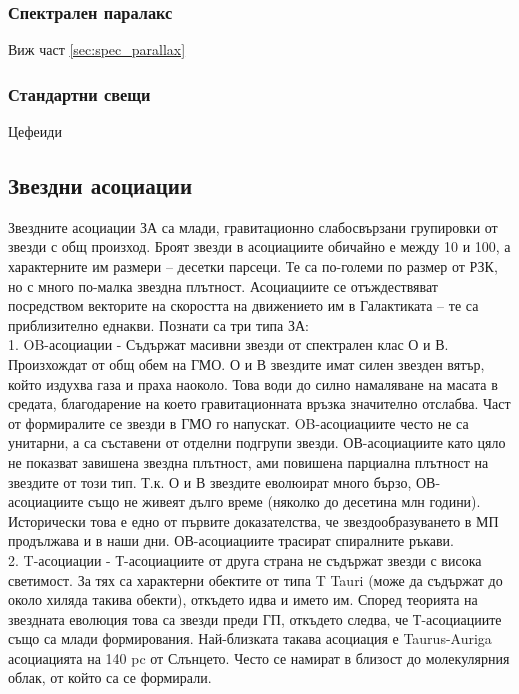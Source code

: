 \documentclass[a4paper,12pt]{article}
\begin{document}
\subsubsection{Спектрален паралакс}
Виж част \ref{sec:spec_parallax}

\subsubsection{Стандартни свещи}
Цефеиди

\subsection{Звездни асоциации}
Звездните асоциации ЗА са млади, гравитационно слабосвързани групировки от звезди с общ произход. Броят звезди в асоциациите обичайно е между 10 и 100, а характерните им размери – десетки парсеци. Те са по-големи по размер от РЗК, но с много по-малка звездна плътност. Асоциациите се отъждествяват посредством векторите на скоростта на движението им в
Галактиката – те са приблизително еднакви. Познати са три типа ЗА:\\

1. OB-асоциации - Съдържат масивни звезди от спектрален клас О и В. Произхождат от общ обем на ГМО. О и В звездите имат силен звезден вятър, който издухва газа и праха наоколо. Това води до силно намаляване на масата в средата, благодарение на което гравитационната връзка значително отслабва. Част от формиралите се звезди в ГМО го напускат. OB-асоциациите често не са унитарни, а са съставени от отделни подгрупи звезди. ОВ-асоциациите като цяло не показват завишена звездна плътност,
ами повишена парциална плътност на звездите от този тип. Т.к. О и В звездите еволюират много бързо, ОВ-асоциациите също не живеят дълго време (няколко до десетина млн години). Исторически това е едно от първите доказателства, че звездообразуването в МП продължава и в наши дни. ОВ-асоциациите трасират спиралните ръкави.\\

2. T-асоциации - Т-асоциациите от друга страна не съдържат звезди с висока светимост. За тях са характерни обектите от типа T Tauri (може да съдържат до около хиляда такива обекти), откъдето идва и името им. Според теорията на звездната еволюция това са звезди преди ГП, откъдето следва, че Т-асоциациите също са млади формирования. Най-близката такава асоциация е Taurus-Auriga асоциацията на 140 pc от Слънцето. Често се намират в близост до молекулярния облак, от който са се формирали.\\
\end{document}
